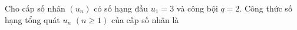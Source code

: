 \begin{ex}
Cho cấp số nhân $(u_n)$ có số hạng đầu $u_1=3$ và công bội $q=2$. Công thức số hạng tổng quát $u_n$ $(n\ge1)$ của cấp số nhân là
\end{ex}
